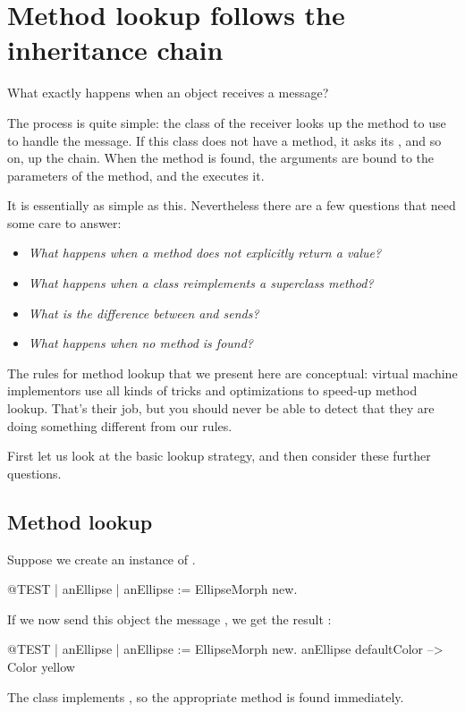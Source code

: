 \documentclass[a4paper,10pt,twoside]{book}
\begin{document}
\section{Method lookup follows the inheritance chain} 


What exactly happens when an object receives a message?

The process is quite simple:
the class of the receiver looks up the method to use to handle the message.
If this class does not have a method, it asks its , and so on, up the  chain.
When the method is found, the arguments are bound to the parameters of the method, and the  executes it.

It is essentially as simple as this.
Nevertheless there are a few questions that need some care to answer:

\begin{itemize}
  \item \emph{What happens when a method does not explicitly return a value?}
  \item \emph{What happens when a class reimplements a superclass method?}
  \item \emph{What is the difference between  and  sends?}
  \item \emph{What happens when no method is found?}
\end{itemize}

The rules for method lookup that we present here are conceptual: virtual machine implementors use all kinds of tricks and optimizations to speed-up method lookup. 
That's their job, but you should never be able to detect that they are doing something different from our rules.

First let us look at the basic lookup strategy, and then consider these further questions.

\subsection{Method lookup}
Suppose we create an instance of .
\begin{code}{@TEST | anEllipse |}
anEllipse := EllipseMorph new.
\end{code}
\noindent
If we now send this object the message , we get the result :
\begin{code}{@TEST | anEllipse | anEllipse := EllipseMorph new.}
anEllipse defaultColor --> Color yellow
\end{code}
\noindent
The class  implements , so the appropriate method is found immediately.
\end{document}
